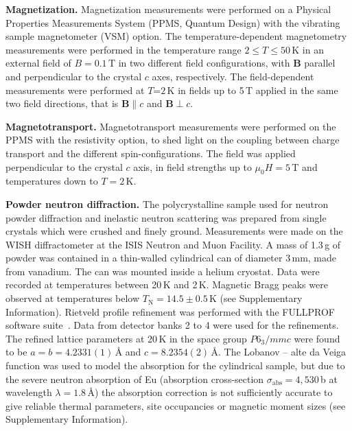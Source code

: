 \documentclass[aps,prl,amsmath,amssymb,amstext,citeautoscript,punctuation,nofootinbib,superscriptaddress,twocolumn]{revtex4-1}
\begin{document}
\textbf{Magnetization.} Magnetization measurements were performed on a Physical Properties Measurements System (PPMS, Quantum Design) with the vibrating sample magnetometer (VSM) option. The temperature-dependent magnetometry measurements were performed in the temperature range $2 \leq T \leq 50$\,K in an external field of $B = 0.1$\,T in two different field configurations, with $\textbf{B}$ parallel and perpendicular to the crystal $c$ axes, respectively. The field-dependent measurements were performed at $T$=$2$\,K in fields up to 5\,T applied in the same two field directions, that is $\textbf{B}$$\parallel$$c$ and $\textbf{B}$$\perp$$c$. 

\textbf{Magnetotransport.} Magnetotransport measurements were performed on the PPMS with the resistivity option, to shed light on the coupling between charge transport and the different spin-configurations. The field was applied perpendicular to the crystal $c$ axis, in field strengths up to $\mu_0 H = 5$\,T and temperatures down to $T = 2$\,K. 

\textbf{Powder neutron diffraction.}
The polycrystalline sample used for neutron powder diffraction and inelastic neutron scattering was prepared from single crystals which were crushed and finely ground.  Measurements were made on the WISH diffractometer at the ISIS Neutron and Muon Facility. A mass of 1.3\,g of powder was contained in a thin-walled cylindrical can of diameter 3\,mm, made from vanadium. The can was mounted inside a helium cryostat. Data were recorded at temperatures between 20\,K and 2\,K. Magnetic Bragg peaks were observed at temperatures below $T_\textrm{N} = 14.5\pm0.5$\,K (see Supplementary Information).  Rietveld profile refinement was performed with the FULLPROF software suite~\cite{fullprof}.  Data from detector banks 2 to 4 were used for the refinements.  The refined lattice parameters at 20\,K in the space group $P6_3/mmc$ were found to be $a = b = 4.2331(1)$\,{\AA} and $c = 8.2354(2)$\,{\AA}. The Lobanov -- alte da Veiga function was used to model the absorption for the cylindrical sample, but due to the severe neutron absorption of Eu (absorption cross-section $\sigma_\mathrm{abs} = 4,530$\,b at wavelength $\lambda = 1.8$\,{\AA}) the absorption correction is not sufficiently accurate to give reliable thermal parameters, site occupancies or magnetic moment sizes (see Supplementary Information).  
 
\end{document}
